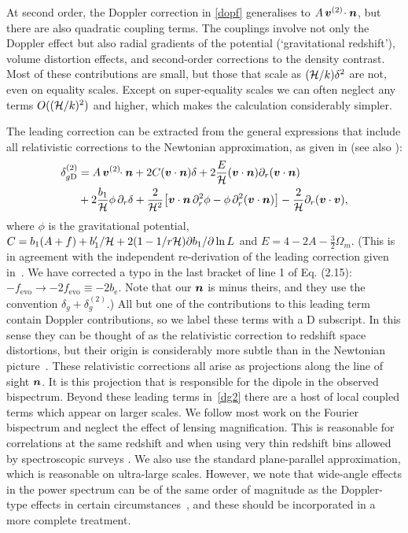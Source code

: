 At second order, the Doppler correction in  \eqref{dopf} generalises to $A\, \bm{v}^{(2)}\!\cdot\bm {n}$, but there are also quadratic coupling terms. The couplings involve not only the Doppler effect but also radial gradients of the potential (`gravitational redshift'), volume distortion effects, and second-order corrections to the density contrast. Most of these contributions are small, but those that scale as $(\mathcal{H}/k)\delta^2$ are not, even on equality scales. Except on super-equality scales we can often neglect any terms $O((\mathcal{H}/k)^{2})$ and higher, which makes the calculation considerably simpler. 

The leading correction can be extracted from the general expressions that include all relativistic  corrections to the Newtonian approximation, as given in  \citet{Bertacca:2014hwa} (see also \citet{Bertacca:2014dra,Yoo:2014sfa,DiDio:2014lka,Jolicoeur:2017nyt,DiDio:2018zmk}):  
\begin{align}
\delta^{(2)}_{g{\mathrm{D}}} &= A \, \bm{v}^{(2)}\!\!\cdot\bm {n}+2{C}(\bm{v}\cdot\bm {n})\delta +2 {\frac{E}{\mathcal{H}}}(\bm{v}\cdot\bm {n})\partial_r(\bm{v}\cdot\bm {n})\label{dg2}
\\ & \nonumber
+ 2 \frac{b_1}{\mathcal{H}}\phi\, \partial_r\delta
+ \frac{2}{\mathcal{H}^2} \big[\bm{v}\cdot\bm {n} \,\partial_r^2\phi-\phi\, \partial_r^2 (\bm{v}\cdot\bm {n}) \big] - \frac{2}{\mathcal{H}}\partial_r (\bm{v}\cdot\bm{v}), 
\end{align}
where $\phi$ is the gravitational potential,   $C = b_1(A + f)+{b_1'/ \mathcal{H}}+ 2(1-{1/ r\mathcal{H}} ){\partial b_1/ \partial\ln L}$ and
$E = {4-2A-{\frac{3}{2}}\Omega_m}$. (This is in agreement with the independent re-derivation of the leading correction  given in~\citet{DiDio:2018zmk}. We have corrected a typo in the last bracket of line 1 of Eq. (2.15): $-f_{\mathrm{evo}}\to -2f_{\mathrm{evo}}\equiv -2b_{\mathrm{e}}$. Note that our $\bm {n}$ is minus theirs, and they use the convention $\delta_g+\delta^{(2)}_g$.) 
All but one of the contributions to this leading term contain Doppler contributions, so we label these terms with a D subscript. In this sense they can be thought of as the relativistic correction to redshift space distortions, but their origin is considerably more subtle than in the Newtonian picture~\citep{Bertacca:2014dra,DiDio:2018zmk}. These relativistic corrections all arise as projections along the line of sight $\bm {n}$. It is this projection that is responsible for the dipole in the observed bispectrum.  Beyond these leading terms in~\eqref{dg2} there are a host of local coupled terms which appear on larger scales. 
We follow most work on the Fourier bispectrum and neglect the effect of lensing magnification. This is reasonable for correlations at the same redshift and when using very thin redshift bins allowed by spectroscopic surveys \citep{DiDio:2018unb}. We also use the standard plane-parallel approximation, which is reasonable on ultra-large scales. However, we note that wide-angle effects in the power spectrum can be of the same order of magnitude as the Doppler-type effects in certain circumstances~\citep{Tansella:2017rpi}, and these should be incorporated in a more complete treatment.


